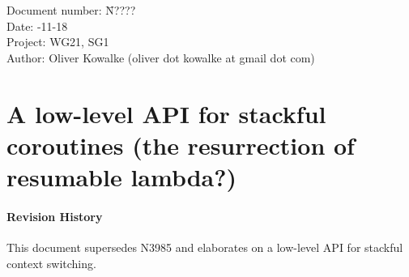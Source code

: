 \documentclass[a4paper,10pt,DIV15]{scrartcl}
\begin{document}
\small
\begin{tabbing}
    Document number: \= N????\\
    Date:            -11-18\\
    Project:         \> WG21, SG1\\
    Author:          \> Oliver Kowalke (oliver dot kowalke at gmail dot com)\\
\end{tabbing}

\section*{A low-level API for stackful coroutines (the resurrection of resumable lambda?)}


\tableofcontents


\paragraph*{Revision History}
This document supersedes N3985 and elaborates on a low-level API for stackful
context switching.












\end{document}
